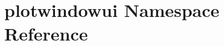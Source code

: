 \hypertarget{namespaceplotwindowui}{\section{plotwindowui Namespace Reference}
\label{namespaceplotwindowui}
}
